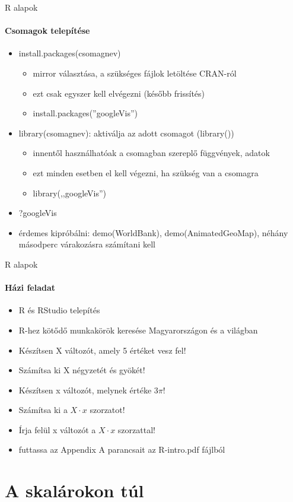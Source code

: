 \documentclass[10pt]{beamer}
\begin{document}
\begin{frame}{R alapok}
\framesubtitle{Csomagok telepítése}
\begin{itemize}
\item install.packages(csomagnev)
\begin{itemize}
\item mirror választása, a szükséges fájlok letöltése CRAN-ról
\item ezt csak egyszer kell elvégezni (később frissítés)
\item install.packages(''googleVis'')
\end{itemize}
\item library(csomagnev): aktiválja az adott csomagot (library())
\begin{itemize}
\item innentől használhatóak a csomagban szereplő függvények, adatok
\item ezt minden esetben el kell végezni, ha szükség van a csomagra
\item library(,,googleVis'')
\end{itemize}
\item ?googleVis
\item érdemes kipróbálni: demo(WorldBank), demo(AnimatedGeoMap), néhány másodperc várakozásra számítani kell
\end{itemize}
\end{frame}

\begin{frame}{R alapok}
\framesubtitle{Házi feladat}
\begin{itemize}
\item R és RStudio telepítés
\item R-hez kötődő munkakörök keresése Magyarországon és a világban
\item Készítsen X változót, amely 5 értéket vesz fel!
\item Számítsa ki X négyzetét és gyökét!
\item Készítsen x változót, melynek értéke $3\pi$!
\item Számítsa ki a $X \cdot x$ szorzatot!
\item Írja felül x változót a $X \cdot x$ szorzattal!
\item futtassa az Appendix A parancsait az R-intro.pdf fájlból
\end{itemize}
\end{frame}

\section{A skalárokon túl}
\end{document}
